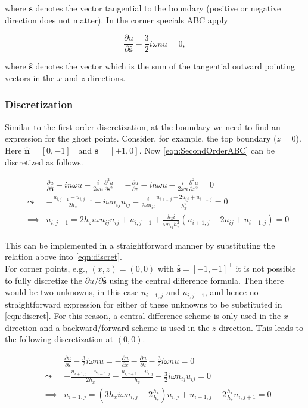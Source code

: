 \documentclass[10pt,a4paper]{article}
\newcommand{\n}{\mathbf{n}}
\newcommand{\s}{\mathbf{s}}
\begin{document}
where $\s$ denotes the vector tangential to the boundary (positive or negative direction does not matter). In the corner specials ABC apply \cite{SecondOrderCorner}

\begin{equation}
\frac{\partial u}{\partial \hat{\s}}-\frac{3}{2}i\omega nu=0,
\end{equation}

where $\hat{\s}$ denotes the vector which is the sum of the tangential outward pointing vectors in the $x$ and $z$ directions.

\subsubsection{Discretization}
Similar to the first order discretization, at the boundary we need to find an expression for the ghost points. Consider, for example, the top boundary ($z=0$). Here $\hat{\n}=[0,-1]^\top$ and $\s=[\pm 1,0]$. Now \cref{eqn:SecondOrderABC} can be discretized as follows.

\begin{eqnarray}
&&\frac{\partial u}{\partial \hat{\n}} - in\omega u - \frac{i}{2\omega n}\frac{\partial^2 u}{\partial \s^2}= -\frac{\partial u}{\partial z} - in\omega u - \frac{i}{2\omega n}\frac{\partial^2 u}{\partial x^2}=0\\
&\leadsto& -\frac{u_{i,j+1}-u_{i,j-1}}{2h_z} - i\omega n_{ij}u_{ij}-\frac{i}{2\omega n_{ij}}\frac{u_{i+1,j}-2u_{ij}+u_{i-1,j}}{h_x^2}=0\\
&\implies& u_{i,j-1} = 2h_z i\omega n_{ij}u_{ij}+u_{i,j+1}+\frac{h_z i}{\omega n_{ij}h_x^2}(u_{i+1,j}-2u_{ij}+u_{i-1,j})=0
\end{eqnarray}

This can be implemented in a straightforward manner by substituting the relation above into \cref{eqn:discret}.\\

For corner points, e.g., $(x,z)=(0,0)$ with $\hat{\s}=[-1,-1]^\top$ it is not possible to fully discretize the $\partial u/\partial\hat{\s}$ using the central difference formula. Then there would be two unknowns, in this case $u_{i-1,j}$ and $u_{i,j-1}$, and hence no straightforward expression for either of these unknowns to be substituted in \cref{eqn:discret}. For this reason, a central difference scheme is only used in the $x$ direction and a backward/forward scheme is used in the $z$ direction. This leads to the following discretization at $(0,0)$.

\begin{eqnarray}
&& \frac{\partial u}{\partial \hat{\s}}-\frac{3}{2}i\omega nu= -\frac{\partial u}{\partial x}-\frac{\partial u}{\partial z}-\frac{3}{2}i\omega nu=0\\
&\leadsto& -\frac{u_{i+1,j}-u_{i-1,j}}{2h_x}-\frac{u_{i,j+1}-u_{i,j}}{h_z}-\frac{3}{2}i\omega n_{ij}u_{ij}=0\\
&\implies& u_{i-1,j} = (3h_xi\omega n_{i,j}-2\frac{h_x}{h_z})u_{i,j}+u_{i+1,j}+2\frac{h_x}{h_z}u_{i,j+1}=0
\end{eqnarray}
\end{document}
